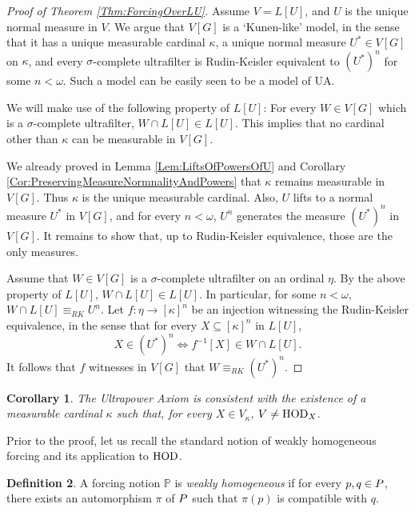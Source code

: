 \documentclass{article}
\theoremstyle{definition}
\newtheorem{definition}{Definition}[section]
\theoremstyle{plain}
\newtheorem{corollary}[definition]{Corollary}
\newcommand{\po}{\mathbb{P}}
\begin{document}
    \begin{proof}[Proof of Theorem \ref{Thm:ForcingOverLU}]
        Assume $V = L[U]$, and $U$ is the unique normal measure in $V$. We argue that $V[G]$ is a `Kunen-like' model, in the sense that it has a unique measurable cardinal $\kappa$, a unique normal measure $U^*\in V[G]$ on $\kappa$, and every $\sigma$-complete ultrafilter is Rudin-Keisler equivalent to $(U^*)^n$ for some $n<\omega$. Such a model can be easily seen to be a model of {\rm UA}.

        We will make use of the following property of $L[U]$: For every $W\in V[G]$ which is a $\sigma$-complete ultrafilter, $W\cap L[U]\in L[U]$. This implies that no cardinal other than $\kappa$ can be measurable in $V[G]$.

        We already proved in Lemma \ref{Lem:LiftsOfPowersOfU} and Corollary \ref{Cor:PreservingMeasureNormnalityAndPowers} that $\kappa$ remains measurable in $V[G]$. Thus $\kappa$ is the unique measurable cardinal. Also, $U$ lifts to a normal measure $U^*$ in $V[G]$, and for every $n<\omega$, $U^n$ generates the measure $(U^*)^n$ in $V[G]$. It remains to show that, up to Rudin-Keisler equivalence, those are the only measures.

        Assume that $W\in V[G]$ is a $\sigma$-complete ultrafilter on an ordinal $\eta$. By the above property of $L[U]$, $W\cap L[U]\in L[U]$. In particular, for some $n<\omega$, $W\cap L[U] \equiv_{RK} U^n$. Let $f\colon \eta\to [\kappa]^n$ be an injection witnessing the Rudin-Keisler equivalence, in the sense that for every $X\subseteq [\kappa]^n$ in $L[U]$,
        $$X\in (U^*)^n \iff f^{-1}[X]\in W\cap L[U].$$ 
        It follows that $f$ witnesses in $V[G]$ that $W\equiv_{RK} (U^*)^n$. 

        
    \end{proof}


\begin{corollary}\label{Cor:UA+Meas+VneqHODX}
    The {Ultrapower Axiom} is consistent with the existence of a measurable cardinal $\kappa$ such that, for every $X\in V_\kappa$, $V\neq {\rm{HOD}}_{X}$.
\end{corollary}

Prior to the proof, let us recall the standard notion of weakly homogeneous forcing and its application to ${\rm HOD}$.

\begin{definition}
A forcing notion $\po$ is \textit{weakly homogeneous} if for every $p,q\in\mathbb \po$, there exists an automorphism $\pi$ of $\mathbb \po$ such that $\pi(p)$ is compatible with $q$.    
\end{definition}
\end{document}
